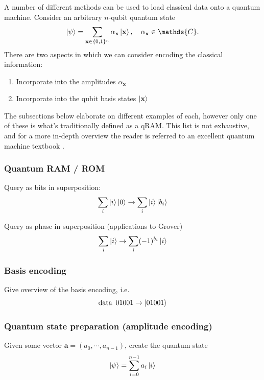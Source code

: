 \documentclass[a4paper,12pt]{article}
\begin{document}
A number of different methods can be used to load classical data onto a quantum machine.
Consider an arbitrary $n$-qubit quantum state
\begin{equation}
 \ket{\psi} = \sum_{\mathbf{x} \in \{0, 1\}^n} \alpha_{\mathbf{x}} \ket{\mathbf{x}}, \quad \alpha_{\mathbf{x}} \in \mathds{C}.
\end{equation}
There are two aspects in which we can consider encoding the classical information:
\begin{enumerate}
 \item Incorporate into the amplitudes $\alpha_{\mathbf{x}}$
 \item Incorporate into the qubit basis states $\ket{\mathbf{x}}$
\end{enumerate}
The subsections below elaborate on different examples of each, however only one of these is what's traditionally defined as a qRAM.
This list is not exhaustive, and for a more in-depth overview the reader is referred to an excellent quantum machine textbook \cite{Schuld2018}.

\subsubsection{Quantum RAM / ROM}

Query as bits in superposition:
\begin{equation}
 \sum_i \ket{i} \ket{0} \rightarrow \sum_i \ket{i} \ket{b_i}
\end{equation}

Query as phase in superposition (applications to Grover)
\begin{equation}
 \sum_i \ket{i} \rightarrow \sum_i (-1)^{b_i} \ket{i}
\end{equation}

\subsubsection{Basis encoding}

Give overview of the basis encoding, i.e.
\begin{equation}
 \hbox{data} \enskip 01001 \rightarrow \ket{01001}
\end{equation}


\subsubsection{Quantum state preparation (amplitude encoding)}

Given some vector $\mathbf{a} = \left( a_0, \cdots,  a_{n-1} \right)$, create the quantum state
\begin{equation}
 \ket{\psi} = \sum_{i=0}^{n-1} a_i \ket{i}
\end{equation}
\end{document}
